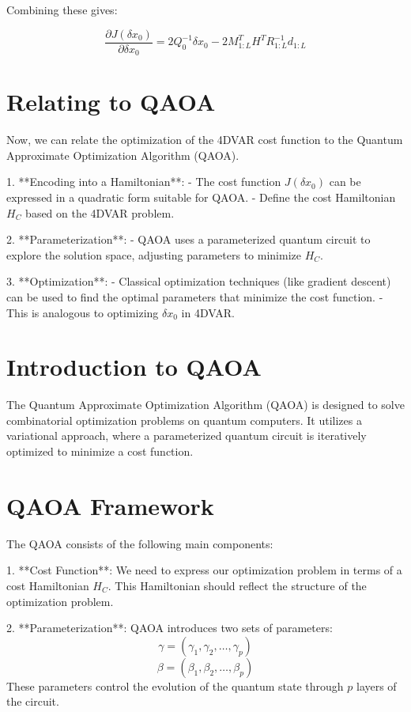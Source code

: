 \documentclass{article}
\begin{document}
Combining these gives:

\begin{equation}
\frac{\partial J(\delta x_0)}{\partial \delta x_0} = 2 Q_0^{-1} \delta x_0 - 2 M^T_{1:L} H^T R_{1:L}^{-1} d_{1:L}
\end{equation}

\section{Relating to QAOA}

Now, we can relate the optimization of the 4DVAR cost function to the Quantum Approximate Optimization Algorithm (QAOA).

1. **Encoding into a Hamiltonian**:
   - The cost function \( J(\delta x_0) \) can be expressed in a quadratic form suitable for QAOA.
   - Define the cost Hamiltonian \( H_C \) based on the 4DVAR problem.

2. **Parameterization**:
   - QAOA uses a parameterized quantum circuit to explore the solution space, adjusting parameters to minimize \( H_C \).

3. **Optimization**:
   - Classical optimization techniques (like gradient descent) can be used to find the optimal parameters that minimize the cost function.
   - This is analogous to optimizing \( \delta x_0 \) in 4DVAR.

\section{Introduction to QAOA}

The Quantum Approximate Optimization Algorithm (QAOA) is designed to solve combinatorial optimization problems on quantum computers. It utilizes a variational approach, where a parameterized quantum circuit is iteratively optimized to minimize a cost function.

\section{QAOA Framework}

The QAOA consists of the following main components:

1. **Cost Function**: We need to express our optimization problem in terms of a cost Hamiltonian \( H_C \). This Hamiltonian should reflect the structure of the optimization problem.

2. **Parameterization**: QAOA introduces two sets of parameters:
   \[
   \gamma = (\gamma_1, \gamma_2, \ldots, \gamma_p)
   \]
   \[
   \beta = (\beta_1, \beta_2, \ldots, \beta_p)
   \]
   These parameters control the evolution of the quantum state through \( p \) layers of the circuit.
\end{document}
